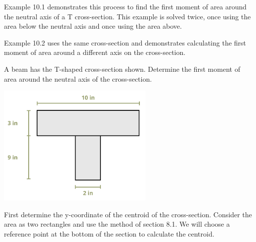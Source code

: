\documentclass[
  letterpaper,
  DIV=11,
  numbers=noendperiod]{scrreprt}
\theoremstyle{definition}
\theoremstyle{remark}
\begin{document}
Example 10.1 demonstrates this process to find the first moment of area
around the neutral axis of a T cross-section. This example is solved
twice, once using the area below the neutral axis and once using the
area above.

Example 10.2 uses the same cross-section and demonstrates calculating
the first moment of area around a different axis on the cross-section.

\begin{tcolorbox}[enhanced jigsaw, leftrule=.75mm, colbacktitle=quarto-callout-tip-color!10!white, breakable, opacityback=0, colback=white, titlerule=0mm, toprule=.15mm, colframe=quarto-callout-tip-color-frame, coltitle=black, title={Example 10.1}, toptitle=1mm, bottomrule=.15mm, rightrule=.15mm, left=2mm, arc=.35mm, opacitybacktitle=0.6, bottomtitle=1mm]

A beam has the T-shaped cross-section shown. Determine the first moment
of area around the neutral axis of the cross-section.

\begin{center}
\includegraphics[width=2.97917in,height=\textheight]{images/CH10 PNGs/example 10.1 part 1.png}
\end{center}

\begin{tcolorbox}[enhanced jigsaw, leftrule=.75mm, colbacktitle=quarto-callout-note-color!10!white, breakable, opacityback=0, colback=white, titlerule=0mm, toprule=.15mm, colframe=quarto-callout-note-color-frame, coltitle=black, title={Solution}, toptitle=1mm, bottomrule=.15mm, rightrule=.15mm, left=2mm, arc=.35mm, opacitybacktitle=0.6, bottomtitle=1mm]

First determine the y-coordinate of the centroid of the cross-section.
Consider the area as two rectangles and use the method of section 8.1.
We will choose a reference point at the bottom of the section to
calculate the centroid.


\end{tcolorbox}
\end{tcolorbox}
\end{document}
